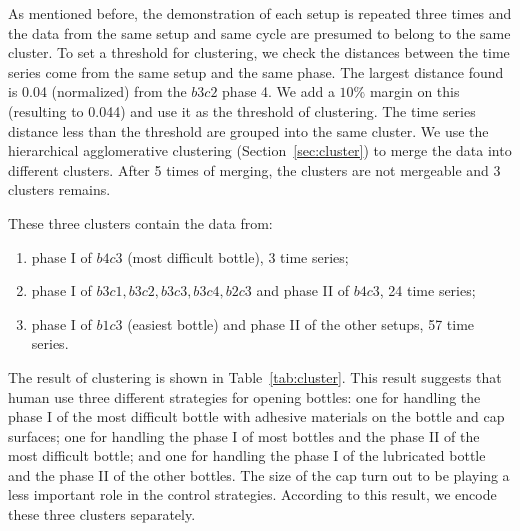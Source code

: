 As mentioned before, the demonstration of each setup is repeated three times and the data from the same setup and same cycle are presumed to belong to the same cluster. To set a threshold for clustering, we check the distances between the time series come from the same setup and the same phase. The largest distance found is 0.04 (normalized) from the $b3c2$ phase 4. We add a $10\%$ margin on this (resulting to 0.044) and use it as the threshold of clustering. The time series distance less than the threshold are grouped into the same cluster. We use the hierarchical agglomerative clustering (Section~\ref{sec:cluster}) to merge the data into different clusters. After 5 times of merging, the clusters are not mergeable and 3 clusters remains.

These three clusters contain the data from:

\begin{enumerate}
\item phase I of $b4c3$ (most difficult bottle), 3 time series;
\item phase I of $b3c1, b3c2, b3c3, b3c4, b2c3$ and phase II of $b4c3$, 24 time series;
\item phase I of $b1c3$ (easiest bottle) and phase II of the other setups, 57 time series.
\end{enumerate}

The result of clustering is shown in Table~\ref{tab:cluster}. This result suggests that human use three different strategies for opening bottles: one for handling the phase I of the most difficult bottle with adhesive materials on the bottle and cap surfaces; one for handling the phase I of most bottles and the phase II of the most difficult bottle; and one for handling the phase I of the lubricated bottle and the phase II of the other bottles. The size of the cap turn out to be playing a less important role in the control strategies. According to this result, we encode these three clusters separately.


